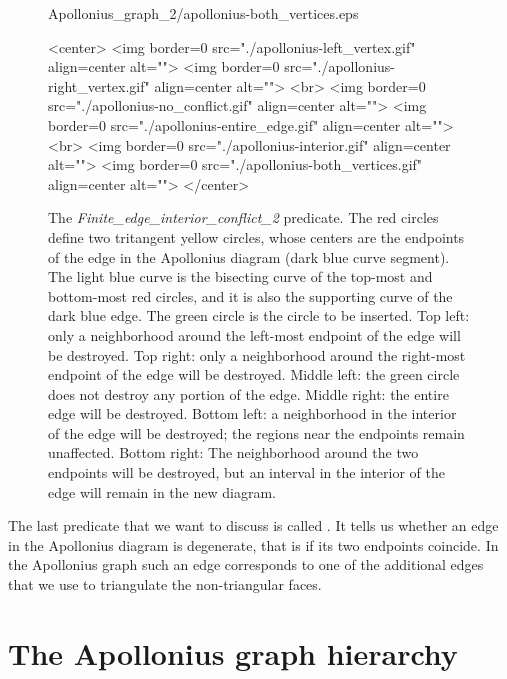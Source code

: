 \begin{figure}[!t]
\begin{ccTexOnly}
\begin{center}
{Apollonius_graph_2/apollonius-both_vertices.eps}\\
\end{center}
\end{ccTexOnly}
\caption{The {\em Finite\_edge\_interior\_conflict\_2} predicate. The red
  circles define two tritangent yellow circles, whose centers are
  the endpoints of the edge in the Apollonius diagram (dark blue curve
  segment). The light blue curve is the bisecting curve of the
  top-most and bottom-most red circles, and it is also the supporting
  curve of the dark blue edge. The green circle is the circle to be
  inserted. Top left: only a neighborhood around the left-most
  endpoint of the edge will be destroyed. Top right: only a
  neighborhood around the right-most endpoint of the edge will be
  destroyed. Middle left: the green circle does not destroy any
  portion of the edge. Middle right: the entire edge will be
  destroyed. Bottom left: a neighborhood in the interior of the edge
  will be destroyed; the regions near the endpoints remain
  unaffected. Bottom right: The neighborhood around the two endpoints
  will be destroyed, but an interval in the interior of the edge will
  remain in the new diagram.\label{fig-ag2edgeconflict}}
\begin{ccHtmlOnly}
<center>
<img border=0 src="./apollonius-left_vertex.gif" align=center alt="">
<img border=0 src="./apollonius-right_vertex.gif" align=center alt="">
<br>
<img border=0 src="./apollonius-no_conflict.gif" align=center alt="">
<img border=0 src="./apollonius-entire_edge.gif" align=center alt="">
<br>
<img border=0 src="./apollonius-interior.gif" align=center alt="">
<img border=0 src="./apollonius-both_vertices.gif" align=center alt="">
</center>
\end{ccHtmlOnly}
\end{figure}


The last predicate that we want to discuss is called
. It tells us whether an edge in the
Apollonius diagram is degenerate, that is if its two endpoints
coincide. In the Apollonius graph such an edge corresponds to one of
the additional edges that we use to triangulate the non-triangular
faces.



\section{The Apollonius graph hierarchy}
\label{sec:apollonius2-hierarchy}

